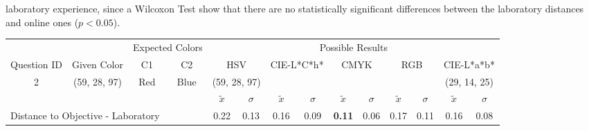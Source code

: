 laboratory experience, since a Wilcoxon Test show that there are no statistically significant differences between the laboratory distances and online ones ($p < 0.05$).
%
\begin{table}[H]
  \resizebox{\textwidth}{!} {
  \begin{tabular}{lccccccccccccc}
    \hline
    \multicolumn{1}{c}{}                              &                                      & \multicolumn{2}{c}{Expected Colors}                   & \multicolumn{10}{c}{Possible Results}                                                                                                                                                                                                                                                                                        \\ \cline{3-14}
    \multicolumn{1}{c}{\multirow{-2}{*}{Question ID}} & \multirow{-2}{*}{Given Color}        & C1                       & C2                         & \multicolumn{2}{c}{HSV}                                        & \multicolumn{2}{c}{CIE-L*C*h*}                                 & \multicolumn{2}{c}{CMYK}                                       & \multicolumn{2}{c}{RGB}                                        & \multicolumn{2}{c}{CIE-L*a*b*}                                 \\ \hline
    \multicolumn{1}{c}{2}                             & \cellcolor[HTML]{FF00FF}(59, 28, 97) & \multicolumn{1}{c|}{Red} & \multicolumn{1}{c|}{Blue}  & \multicolumn{2}{c|}{\cellcolor[HTML]{FF00FF}(59, 28, 97)}      & \multicolumn{2}{c|}{\cellcolor[HTML]{FB0080}{\color[HTML]{FFFFFF}(44, 22, 22)}}       & \multicolumn{2}{c|}{\cellcolor[HTML]{800080}{\color[HTML]{FFFFFF}(13, 6, 21)}}       & \multicolumn{2}{c|}{\cellcolor[HTML]{800080}{\color[HTML]{FFFFFF}(13, 6, 21)}}       & \multicolumn{2}{c|}{\cellcolor[HTML]{CA0088}(29, 14, 25)}       \\ \hline
                                                      & \multicolumn{1}{l}{}                 & \multicolumn{1}{l}{}     & \multicolumn{1}{l}{}       & \multicolumn{1}{c}{$\tilde{x}$} & \multicolumn{1}{c}{$\sigma$} & \multicolumn{1}{c}{$\tilde{x}$} & \multicolumn{1}{c}{$\sigma$} & \multicolumn{1}{c}{$\tilde{x}$} & \multicolumn{1}{c}{$\sigma$} & \multicolumn{1}{c}{$\tilde{x}$} & \multicolumn{1}{c}{$\sigma$} & \multicolumn{1}{c}{$\tilde{x}$} & \multicolumn{1}{c}{$\sigma$} \\ \hline
    \multicolumn{4}{l}{Distance to Objective - Laboratory}                                                                                           & \multicolumn{1}{|c}{0.22}       & \multicolumn{1}{c|}{0.13}    & \multicolumn{1}{|c}{0.16}       & \multicolumn{1}{c|}{0.09}    & \multicolumn{1}{|c}{\textbf{0.11}}       & \multicolumn{1}{c|}{0.06}    & \multicolumn{1}{|c}{0.17}       & \multicolumn{1}{c|}{0.11}    & \multicolumn{1}{|c}{0.16}       & \multicolumn{1}{c|}{0.08}    \\

\end{tabular}}
\end{table}
